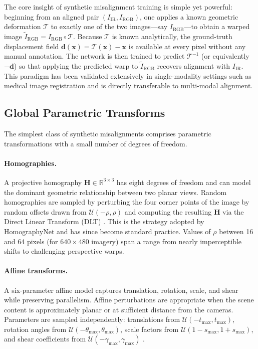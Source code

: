 The core insight of synthetic misalignment training is simple yet powerful:
beginning from an aligned pair $(I_{\mathrm{IR}}, I_{\mathrm{RGB}})$, one
applies a known geometric deformation $\mathcal{T}$ to exactly one of the two
images---say $I_{\mathrm{RGB}}$---to obtain a warped image
$\tilde{I}_{\mathrm{RGB}} = I_{\mathrm{RGB}} \circ \mathcal{T}$.  Because
$\mathcal{T}$ is known analytically, the ground-truth displacement field
$\mathbf{d}(\mathbf{x}) = \mathcal{T}(\mathbf{x}) - \mathbf{x}$ is available
at every pixel without any manual annotation.  The network is then trained to
predict $\mathcal{T}^{-1}$ (or equivalently $-\mathbf{d}$) so that applying the
predicted warp to $\tilde{I}_{\mathrm{RGB}}$ recovers alignment with
$I_{\mathrm{IR}}$.  This paradigm has been validated extensively in
single-modality settings such as medical image registration
\cite{balakrishnan2019voxelmorph} and is directly transferable to multi-modal
alignment.

\subsection{Global Parametric Transforms}
\label{subsec:global_transforms}

The simplest class of synthetic misalignments comprises parametric
transformations with a small number of degrees of freedom.

\paragraph{Homographies.}
A projective homography $\mathbf{H} \in \mathbb{R}^{3\times 3}$ has eight
degrees of freedom and can model the dominant geometric relationship between
two planar views.  Random homographies are sampled by perturbing the four
corner points of the image by random offsets drawn from
$\mathcal{U}(-\rho, \rho)$ and computing the resulting $\mathbf{H}$ via the
Direct Linear Transform (DLT) \cite{hartley2003multiple}.  This is the
strategy adopted by HomographyNet \cite{detone2016deep} and has since become
standard practice.  Values of $\rho$ between 16 and 64 pixels (for
$640\times480$ imagery) span a range from nearly imperceptible shifts to
challenging perspective warps.

\paragraph{Affine transforms.}
A six-parameter affine model captures translation, rotation, scale, and shear
while preserving parallelism.  Affine perturbations are appropriate when the
scene content is approximately planar or at sufficient distance from the
cameras.  Parameters are sampled independently: translations from
$\mathcal{U}(-t_{\max}, t_{\max})$, rotation angles from
$\mathcal{U}(-\theta_{\max}, \theta_{\max})$, scale factors from
$\mathcal{U}(1-s_{\max}, 1+s_{\max})$, and shear coefficients from
$\mathcal{U}(-\gamma_{\max}, \gamma_{\max})$ \cite{jaderberg2015spatial}.


